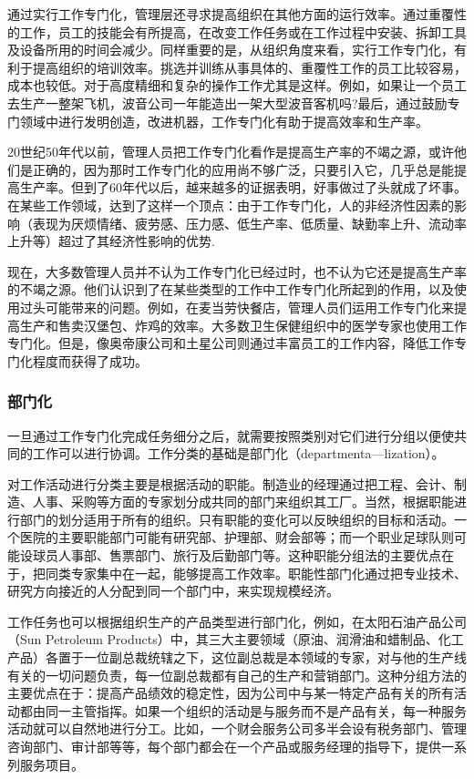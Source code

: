     通过实行工作专门化，管理层还寻求提高组织在其他方面的运行效率。通过重覆性的工作，员工的技能会有所提高，在改变工作任务或在工作过程中安装、拆卸工具及设备所用的时间会减少。同样重要的是，从组织角度来看，实行工作专门化，有利于提高组织的培训效率。挑选并训练从事具体的、重覆性工作的员工比较容易，成本也较低。对于高度精细和复杂的操作工作尤其是这样。例如，如果让一个员工去生产一整架飞机，波音公司一年能造出一架大型波音客机吗?最后，通过鼓励专门领域中进行发明创造，改进机器，工作专门化有助于提高效率和生产率。

    20世纪50年代以前，管理人员把工作专门化看作是提高生产率的不竭之源，或许他们是正确的，因为那时工作专门化的应用尚不够广泛，只要引入它，几乎总是能提高生产率。但到了60年代以后，越来越多的证据表明，好事做过了头就成了坏事。在某些工作领域，达到了这样一个顶点：由于工作专门化，人的非经济性因素的影响（表现为厌烦情绪、疲劳感、压力感、低生产率、低质量、缺勤率上升、流动率上升等）超过了其经济性影响的优势.

    现在，大多数管理人员并不认为工作专门化已经过时，也不认为它还是提高生产率的不竭之源。他们认识到了在某些类型的工作中工作专门化所起到的作用，以及使用过头可能带来的问题。例如，在麦当劳快餐店，管理人员们运用工作专门化来提高生产和售卖汉堡包、炸鸡的效率。大多数卫生保健组织中的医学专家也使用工作专门化。但是，像奥帝康公司和土星公司则通过丰富员工的工作内容，降低工作专门化程度而获得了成功。

    \subsubsection {部门化}

    一旦通过工作专门化完成任务细分之后，就需要按照类别对它们进行分组以便使共同的工作可以进行协调。工作分类的基础是部门化（departmenta—lization）。

    对工作活动进行分类主要是根据活动的职能。制造业的经理通过把工程、会计、制造、人事、采购等方面的专家划分成共同的部门来组织其工厂。当然，根据职能进行部门的划分适用于所有的组织。只有职能的变化可以反映组织的目标和活动。一个医院的主要职能部门可能有研究部、护理部、财会部等；而一个职业足球队则可能设球员人事部、售票部门、旅行及后勤部门等。这种职能分组法的主要优点在于，把同类专家集中在一起，能够提高工作效率。职能性部门化通过把专业技术、研究方向接近的人分配到同一个部门中，来实现规模经济。

    工作任务也可以根据组织生产的产品类型进行部门化，例如，在太阳石油产品公司（Sun Petroleum Products）中，其三大主要领域（原油、润滑油和蜡制品、化工产品）各置于一位副总裁统辖之下，这位副总裁是本领域的专家，对与他的生产线有关的一切问题负责，每一位副总裁都有自己的生产和营销部门。这种分组方法的主要优点在于：提高产品绩效的稳定性，因为公司中与某一特定产品有关的所有活动都由同一主管指挥。如果一个组织的活动是与服务而不是产品有关，每一种服务活动就可以自然地进行分工。比如，一个财会服务公司多半会设有税务部门、管理咨询部门、审计部等等，每个部门都会在一个产品或服务经理的指导下，提供一系列服务项目。

